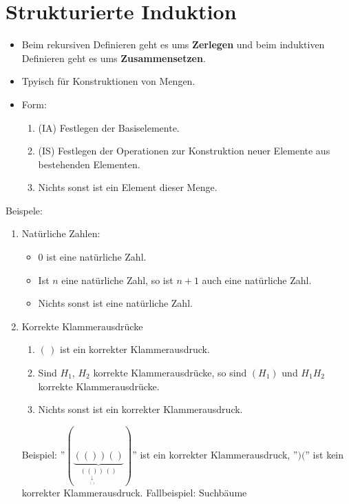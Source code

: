 \documentclass[12pt]{book}													%
\begin{document}
\section{Strukturierte Induktion}
\begin{itemize}
\item Beim rekursiven Definieren geht es ums {\bf Zerlegen} und beim induktiven Definieren geht es ums {\bf Zusammensetzen}.
\item Tpyisch für Konstruktionen von Mengen.
\item Form:
\begin{enumerate}
\item (IA) Festlegen der Basiselemente.
\item (IS) Festlegen der Operationen zur Konstruktion neuer Elemente aus bestehenden Elementen.
\item Nichts sonst ist ein Element dieser Menge.
\end{enumerate}
\end{itemize}
Beispele:
\begin{enumerate}
\item Natürliche Zahlen:
\begin{itemize}
\item $0$ ist eine natürliche Zahl.
\item Ist $n$ eine natürliche Zahl, so ist $n{+}1$ auch eine natürliche Zahl.
\item Nichts sonst ist eine natürliche Zahl.
\end{itemize}
\item Korrekte Klammerausdrücke
\begin{enumerate}
\item $(\,)$ ist ein korrekter Klammerausdruck.
\item Sind $H_1$, $H_2$ korrekte Klammerausdrücke, so sind $(H_1)$ und $H_1H_2$ korrekte Klammerausdrücke.
\item Nichts sonst ist ein korrekter Klammerausdruck.
\end{enumerate}
Beispiel: ''$(\underbrace{(())()}_{
	\underset{\underset{()}{\downarrow}}{(())}
	\,
	()
})$'' ist ein korrekter Klammerausdruck, ''$)($'' ist kein korrekter Klammerausdruck.
Fallbeispiel: Suchbäume
\end{enumerate}
\end{document}
